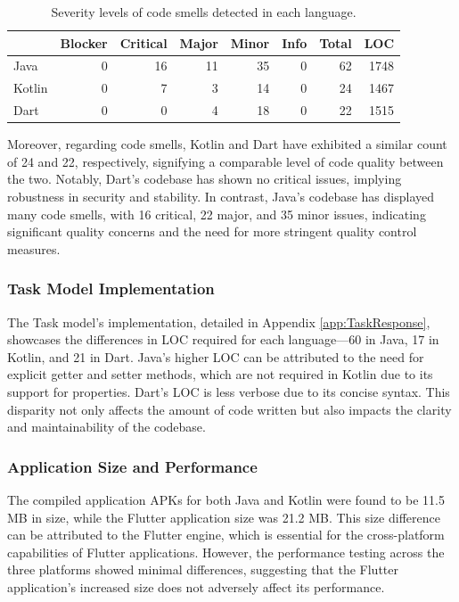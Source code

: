 \begin{table}[htbp]
	\begin{tabular}{l|r|r|r|r|r|r|r}
		\hline
        \cellcolor{Gray} & \cellcolor{Gray}Blocker & \cellcolor{Gray} Critical & \cellcolor{Gray} Major& \cellcolor{Gray}Minor& \cellcolor{Gray}Info & \cellcolor{Gray}Total& \cellcolor{Gray}LOC\\
        \hline
        \cellcolor{Gray} Java    & 0 & 16 & 11 & 35 & 0 & 62 & 1748 \\
        \cellcolor{Gray}Kotlin  & 0 & 7 & 3 & 14 & 0 & 24 & 1467 \\
        \cellcolor{Gray}Dart & 0 & 0 & 4 & 18 & 0 & 22 & 1515 \\
    
    \end{tabular}
	\caption{Severity levels of code smells detected in each language. \label{tab:kanban}}
\end{table}
\par
Moreover, regarding code smells, Kotlin and Dart have exhibited a similar count of 24 and 22, respectively, signifying a comparable level of code quality between the two. Notably, Dart's codebase has shown no critical issues, implying robustness in security and stability. In contrast, Java's codebase has displayed many code smells, with 16 critical, 22 major, and 35 minor issues, indicating significant quality concerns and the need for more stringent quality control measures.
\subsubsection{Task Model Implementation}
The Task model's implementation, detailed in Appendix \ref*{app:TaskResponse}, showcases the differences in LOC required for each language—60 in Java, 17 in Kotlin, and 21 in Dart. Java's higher LOC can be attributed to the need for explicit getter and setter methods, which are not required in Kotlin due to its support for properties. Dart's LOC is less verbose due to its concise syntax. This disparity not only affects the amount of code written but also impacts the clarity and maintainability of the codebase.
\subsubsection{Application Size and Performance}
The compiled application APKs for both Java and Kotlin were found to be 11.5 MB in size, while the Flutter application size was 21.2 MB. This size difference can be attributed to the Flutter engine, which is essential for the cross-platform capabilities of Flutter applications. However, the performance testing across the three platforms showed minimal differences, suggesting that the Flutter application's increased size does not adversely affect its performance.
